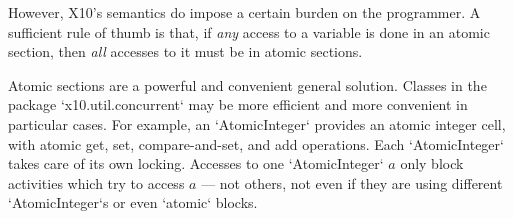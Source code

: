 However, X10's semantics do impose a certain burden on the programmer.  A
sufficient rule of thumb is that, if {\em any} access to a
variable is done in an atomic section, then {\em all} accesses to it must be
in atomic sections.  

Atomic sections are a powerful and convenient general solution.  Classes in
the package 
\xcd`x10.util.concurrent` may be more efficient and more convenient in
particular cases.  For example, an \xcd`AtomicInteger` provides an atomic
integer cell, with atomic get, set, compare-and-set, and add operations.
Each \xcd`AtomicInteger` takes care of its own locking.  Accesses to one 
\xcd`AtomicInteger` {$a$} only block activities which try to access {$a$} ---
not others, not even if they are using different \xcd`AtomicInteger`s or even
\xcd`atomic` blocks.
